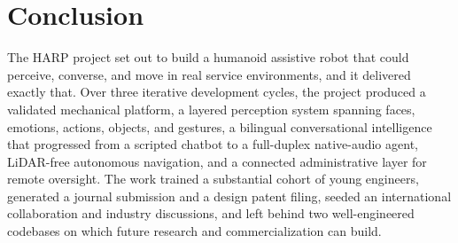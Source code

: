 \documentclass[11pt,a4paper]{article}
\begin{document}
\section{Conclusion}

The HARP project set out to build a humanoid assistive robot that could perceive, converse, and move in real service environments, and it delivered exactly that. Over three iterative development cycles, the project produced a validated mechanical platform, a layered perception system spanning faces, emotions, actions, objects, and gestures, a bilingual conversational intelligence that progressed from a scripted chatbot to a full-duplex native-audio agent, LiDAR-free autonomous navigation, and a connected administrative layer for remote oversight. The work trained a substantial cohort of young engineers, generated a journal submission and a design patent filing, seeded an international collaboration and industry discussions, and left behind two well-engineered codebases on which future research and commercialization can build.
\end{document}
